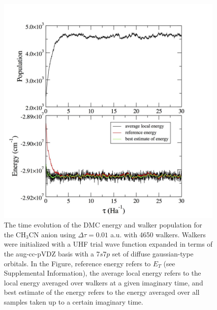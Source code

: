 \begin{center}
\begin{figure}[htbp]
\includegraphics[width=\textwidth]{Images/chapter2/DMC-4.pdf}
\caption{The time evolution of the DMC energy and walker population for the CH$_{3}$CN anion using $\Delta \tau = 0.01$ a.u. with 4650 walkers. Walkers were initialized with a UHF trial wave function expanded in terms of the aug-cc-pVDZ basis with a 7$s$7$p$ set of diffuse gaussian-type orbitals. In the Figure, reference energy refers to $E_{T}$ (see Supplemental Information), the average local energy refers to the local energy averaged over walkers at a given imaginary time, and best estimate of the energy refers to the energy averaged over all samples taken up to a certain imaginary time.}
\label{f2}
\end{figure}
\end{center}
